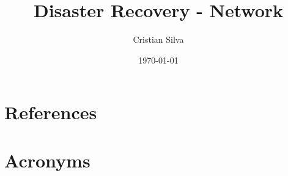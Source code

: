 \documentclass[PMO,authoryear,lsstdraft,toc]{lsstdoc}
\title{Disaster Recovery - Network}
\author{%
Cristian Silva
}
\date {\today}
\begin{document}
\maketitle








\appendix
\section{References} \label{sec:bib}
\renewcommand{\refname}{} %


\section{Acronyms} \label{sec:acronyms}

\end{document}
